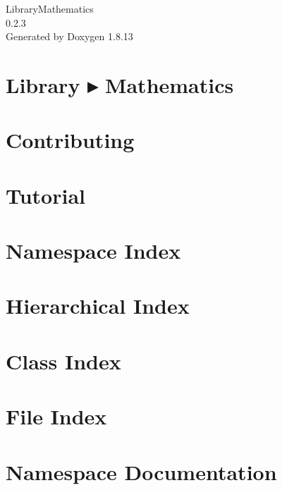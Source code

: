\documentclass[twoside]{book}
\newcommand{\+}{\discretionary{\mbox{\scriptsize$\hookleftarrow$}}{}{}}
\newcommand{\clearemptydoublepage}{%
  \newpage{\pagestyle{empty}\cleardoublepage}%
}
\begin{document}
\hypersetup{pageanchor=false,
             bookmarksnumbered=true,
             pdfencoding=unicode
            }
\begin{titlepage}
\vspace*{7cm}
\begin{center}%
{\Large Library\+Mathematics \\[1ex]\large 0.\+2.\+3 }\\
\vspace*{1cm}
{\large Generated by Doxygen 1.8.13}\\
\end{center}
\end{titlepage}
\clearemptydoublepage
{}
\tableofcontents
\clearemptydoublepage
{}
\hypersetup{pageanchor=true}

\chapter{Library ▸ Mathematics}
\label{index}\hypertarget{index}{}
\chapter{Contributing}
\label{md__c_o_n_t_r_i_b_u_t_i_n_g}

\chapter{Tutorial}
\label{md_docs__tutorial}

\chapter{Namespace Index}

\chapter{Hierarchical Index}

\chapter{Class Index}

\chapter{File Index}

\chapter{Namespace Documentation}










\end{document}
